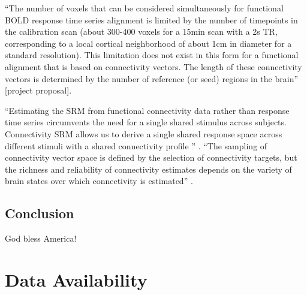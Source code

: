 %
``The number of voxels that can be considered simultaneously for functional BOLD
response time series alignment is limited by the number of timepoints in the
calibration scan (about 300-400 voxels for a 15min scan with a 2s TR,
corresponding to a local cortical neighborhood of about 1cm in diameter for a
standard resolution).
%
This limitation does not exist in this form for a functional alignment that is
based on connectivity vectors.
%
The length of these connectivity vectors is determined by the number of
reference (or seed) regions in the brain'' [project proposal].

``Estimating the SRM from functional connectivity data rather than response time
series circumvents the need for a single shared stimulus across subjects.
%
Connectivity SRM allows us to derive a single shared response space across
different stimuli with a shared connectivity profile
\citep{nastase2019leveraging}'' \citep{kumar2020brainiak}.
%
``The sampling of connectivity vector space is defined by the selection of
connectivity targets, but the richness and reliability of connectivity estimates
depends on the variety of brain states over which connectivity is estimated''
\citep{haxby2020hyperalignment}.




\subsection{Conclusion}

God bless America!


\section{Data Availability}



